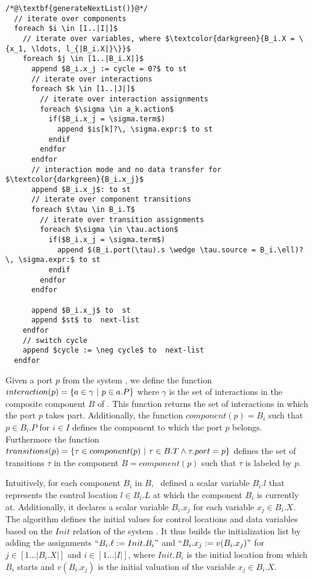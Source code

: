 \begin{lstlisting}
/*@\textbf{generateNextList()}@*/ 
  // iterate over components
  foreach $i \in [1..|I|]$ 
    // iterate over variables, where $\textcolor{darkgreen}{B_i.X = \{x_1, \ldots, l_{|B_i.X|}\}}$ 
    foreach $j \in [1..|B_i.X|]$ 
      append $B_i.x_j := cycle = 0?$ to st
      // iterate over interactions
      foreach $k \in [1..|J|]$ 
        // iterate over interaction assignments
        foreach $\sigma \in a_k.action$
          if($B_i.x_j = \sigma.term$)
            append $is[k]?\, \sigma.expr:$ to st
          endif
        endfor
      endfor
      // interaction mode and no data transfer for $\textcolor{darkgreen}{B_i.x_j}$
      append $B_i.x_j$: to st 
      // iterate over component transitions
      foreach $\tau \in B_i.T$ 
        // iterate over transition assignments
        foreach $\sigma \in \tau.action$
          if($B_i.x_j = \sigma.term$)
            append $(B_i.port(\tau).s \wedge \tau.source = B_i.\ell)?\, \sigma.expr:$ to st 
          endif
        endfor
      endfor  
      
      append $B_i.x_j$ to  st 
      append $st$ to  next-list 
    endfor
    // switch cycle
    append $cycle := \neg cycle$ to  next-list 
  endfor
\end{lstlisting}


Given a port $p$ from the system \Pm, we define the function
$interaction(p) = \{ a \in \gamma~|~p \in a.P \}$ where $\gamma$
is the set of interactions in the composite component $B$ of \Pm.
This function returns the set of interactions in which the port 
$p$ takes part. Additionally, the function 
$component(p) = B_i$ such that $p \in B_i.P$ for $i \in I$ defines
the component to which the port $p$ belongs. Furthermore the function
$transitions(p) = \{ \tau \in component(p)~|~\tau \in B.T \land \tau.port = p \}$ defines the 
set of transitions $\tau$ in the component $B = component(p)$ such that $\tau$ 
is labeled by $p$. 

Intuitively, for each component $B_i$ in $B$, \biptool~defined a scalar variable 
$B_i.l$ that represents the control location $l \in B_i.L$ at which the 
component $B_i$ is currently at. Additionally, it declares a scalar variable
$B_i.x_j$ for each variable $x_j \in B_i.X$. 
The algorithm defines the initial values for control locations and data variables 
based on the $Init$ relation of the system \Pm. It thus builds the initialization 
list by adding the assignments $``B_i.\ell := Init.B_i"$ and $``B_i.x_j := v(B_i.x_j)"$
for $j \in [1\ldots|B_i.X|]$ and $i \in [1\ldots|I|]$, where $Init.B_i$ is 
the initial location from which $B_i$ starts and $v(B_i.x_j)$ is the initial valuation of the
variable $x_j \in B_i.X$.


